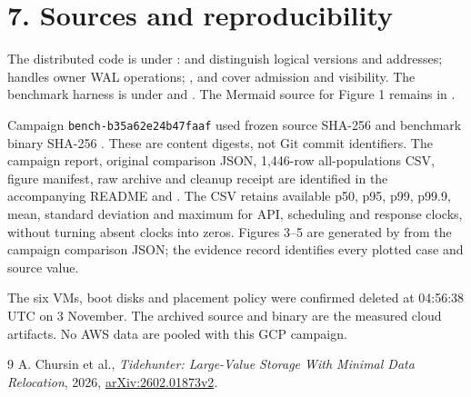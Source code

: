 \documentclass[10pt,a4paper]{article}
\begin{document}
\clearpage

\section*{7. Sources and reproducibility}
The distributed code is under :  and  distinguish logical versions and addresses;  handles owner WAL operations; ,  and  cover admission and visibility. The benchmark harness is under  and . The Mermaid source for Figure 1 remains in .

Campaign \texttt{bench-b35a62e24b47faaf} used frozen source SHA-256  and benchmark binary SHA-256 . These are content digests, not Git commit identifiers. The campaign report, original comparison JSON, 1,446-row all-populations CSV, figure manifest, raw archive and cleanup receipt are identified in the accompanying README and . The CSV retains available p50, p95, p99, p99.9, mean, standard deviation and maximum for API, scheduling and response clocks, without turning absent clocks into zeros. Figures 3--5 are generated by  from the campaign comparison JSON; the evidence record identifies every plotted case and source value.

The six VMs, boot disks and placement policy were confirmed deleted at 04:56:38 UTC on 3 November. The archived source and binary are the measured cloud artifacts. No AWS data are pooled with this GCP campaign.

\begin{thebibliography}{9}\small
{} A. Chursin et al., \emph{Tidehunter: Large-Value Storage With Minimal Data Relocation}, 2026, \href{https://arxiv.org/abs/2602.01873v2}{arXiv:2602.01873v2}.
\end{thebibliography}
\end{document}
